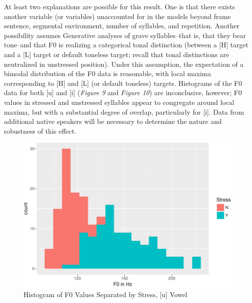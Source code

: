 \documentclass[english,man]{apa6}
\theoremstyle{definition}
\theoremstyle{definition}
\theoremstyle{definition}
\theoremstyle{remark}
\begin{document}
At least two explanations are possible for this result. One is that
there exists another variable (or variables) unaccounted for in the
models beyond frame sentence, segmental environment, number of
syllables, and repetition. Another possibility assumes Generative
analyses of grave syllables--that is, that they bear tone--and that F0
is realizing a categorical tonal distinction (between a {[}H{]} target
and a {[}L{]} target or default toneless target; recall that tonal
distinctions are neutralized in unstressed position). Under this
assumption, the expectation of a bimodal distribution of the F0 data is
reasonable, with local maxima corresponding to {[}H{]} and {[}L{]} (or
default toneless) targets. Histograms of the F0 data for both {[}u{]}
and {[}i{]} (\textit{Figure 9} and \textit{Figure 10}) are inconclusive,
however; F0 values in stressed and unstressed syllables appear to
congregate around local maxima, but with a substantial degree of
overlap, particularly for {[}i{]}. Data from additional native speakers
will be necessary to determine the nature and robustness of this effect.

\begin{figure}
\centering
\includegraphics{lithuanian_article_files/figure-latex/Figure9-1.pdf}
\caption{\label{fig:Figure9}Histogram of F0 Values Separated by Stress,
{[}u{]} Vowel}
\end{figure}
\end{document}
